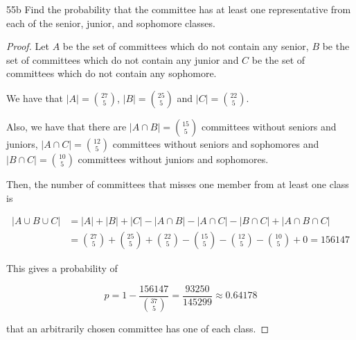 \begin{exercise}{55b}
    Find the probability that the committee has at least one representative from each of the senior, junior, and sophomore classes.
\end{exercise}

\begin{proof}
    Let $A$ be the set of committees which do not contain any senior, $B$ be the set of committees which do not contain any junior and $C$ be the set of committees which do not contain any sophomore.

    We have that $|A| = {27 \choose 5}$, $|B| = {25 \choose 5}$ and $|C| = {22 \choose 5}$.

    Also, we have that there are $|A \cap B| = {15 \choose 5}$ committees without seniors and juniors, $|A \cap C| = {12 \choose 5}$ committees without seniors and sophomores and $|B \cap C| = {10 \choose 5}$ committees without juniors and sophomores.

    Then, the number of committees that misses one member from at least one class is

    \begin{align*}
        |A \cup B \cup C| &= |A| + |B| + |C| - |A \cap B| - |A \cap C| - |B \cap C| + |A \cap B \cap C|\\
        &= {27 \choose 5}+ {25 \choose 5}+ {22 \choose 5} - {15 \choose 5} - {12 \choose 5} - {10 \choose 5} +0= 156147
    \end{align*}
    $$$$

    This gives a probability of

    $$p = 1-\frac{156147}{ {37 \choose 5}} = \frac{93250}{145299} \approx 0.64178$$

    that an arbitrarily chosen committee has one of each class.
    
    \end{proof}


